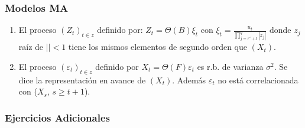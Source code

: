 \subsubsection*{Modelos MA}

\begin{enumerate}[resume]
\item El proceso $(Z_{t} )_{t\in z}$ definido por: $Z_{t} =\Theta \left( B \right)\xi_{t} $ con $\xi_{t} =\displaystyle \frac{u_{t}}{\prod_{j=r'+l}^{q} \left| z_{j}\right|}$ donde $z_{j}$ ra\'{i}z de $\left| \right|<1$ tiene los mismos elementos de segundo orden que $(X_{t})$.

\item El proceso $(\varepsilon_{t} )_{t\in z} $ definido por $X_{t} =\Theta \left(F \right)\varepsilon_{t} $ es r.b. de varianza $\sigma^{2}$. Se dice la representaci\'{o}n en avance de $(X_{{t}})$. Adem\'{a}s $\varepsilon_{t} $ no est\'{a} correlacionada con ($X_{s}$, $s\ge t+1$).
\end{enumerate}

\subsubsection*{Ejercicios Adicionales}

